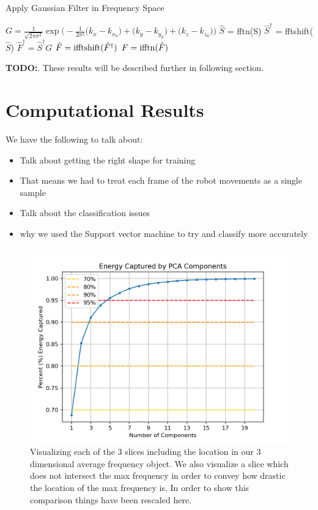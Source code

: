 \documentclass[11pt]{amsart}
\begin{document}
\begin{algorithm}
\caption{Apply Gaussian Filter in Frequency Space}\label{alg:classification}
\begin{algorithmic}
\State $ G = \frac {1}{\sqrt{2 \pi \sigma^2}}\exp \Big( - \frac{1}{2 \sigma^2 }\big(k_x - k_{x_0}\big) + \big(k_y - k_{y_0}\big) + \big(k_z - k_{z_0}\big) \Big)$ 
\State $\hat S$ = fftn(S)
\State $\hat S^\dag$ = fftshift($\hat S$)
\State $\hat F^\dag = \hat S^\dag G$ 
\State $\hat F = {\rm ifftshift}(\hat F^\dag)$
\State $F = {\rm ifftn}(\hat F)$ 
\end{algorithmic}
\end{algorithm}

\textbf{TODO:}. These results will be described further in following section.

\section{Computational Results}\label{sec:results}
We have the following to talk about:
\begin{itemize}
\item Talk about getting the right shape for training
\item That means we had to treat each frame of the robot movements as a single sample
\item Talk about the classification issues
\item why we used the Support vector machine to try and classify more accurately
\end{itemize}

\begin{figure}[h]
	\centering
	\includegraphics[width=.5\textwidth]{../visualizations/energy_by_components.png}
 	\caption{Visualizing each of the 3 slices including the location in our 3 dimensional average frequency object. We also visualize a slice which does not intersect the max frequency in order to convey how drastic the location of the max frequency is. In order to show this comparison things have been rescaled here.}\label{fig:f0}
\end{figure}
\end{document}
